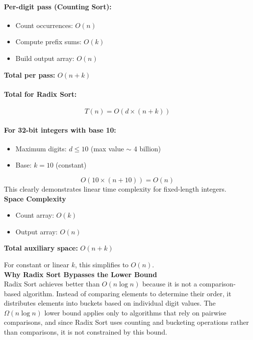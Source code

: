 \documentclass[12pt]{article}
\begin{document}
\paragraph{Per-digit pass (Counting Sort):}
\begin{itemize}
    \item Count occurrences: $O(n)$
    \item Compute prefix sums: $O(k)$
    \item Build output array: $O(n)$
\end{itemize}
\noindent \textbf{Total per pass:} $O(n + k)$

\paragraph{Total for Radix Sort:}
\[
T(n) = O(d \times (n + k))
\]

\paragraph{For 32-bit integers with base 10:}
\begin{itemize}
    \item Maximum digits: $d \leq 10$ (max value $\sim$ 4 billion)
    \item Base: $k = 10$ (constant)
\end{itemize}
\[
O(10 \times (n + 10)) = O(n)
\]
This clearly demonstrates linear time complexity for fixed-length integers.\\

\noindent\textbf{Space Complexity}

\begin{itemize}
    \item Count array: $O(k)$
    \item Output array: $O(n)$
\end{itemize}
\noindent \textbf{Total auxiliary space:} $O(n + k)$

For constant or linear $k$, this simplifies to $O(n)$.\\

\noindent\textbf{Why Radix Sort Bypasses the Lower Bound}\\

Radix Sort achieves better than $O(n \log n)$ because it is not a comparison-based algorithm. Instead of comparing elements to determine their order, it distributes elements into buckets based on individual digit values. The $\Omega(n \log n)$ lower bound applies only to algorithms that rely on pairwise comparisons, and since Radix Sort uses counting and bucketing operations rather than comparisons, it is not constrained by this bound.\\
\end{document}
